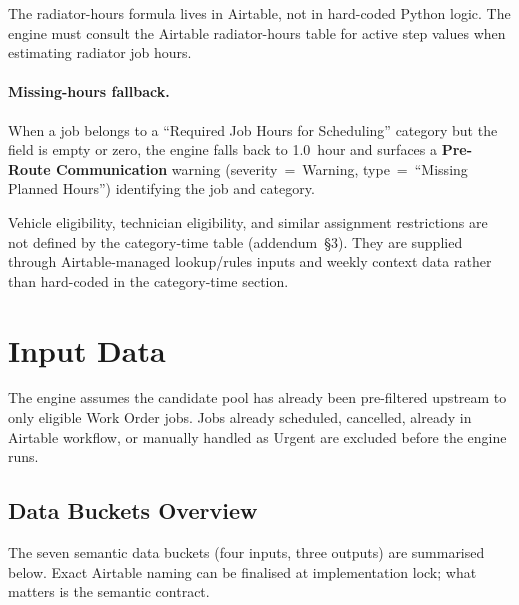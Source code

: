\documentclass[12pt]{article}
\begin{document}
The radiator-hours formula lives in Airtable, not in hard-coded Python logic.
The engine must consult the Airtable radiator-hours table for active step values when estimating radiator job hours.

\paragraph{Missing-hours fallback.}
When a job belongs to a ``Required Job Hours for Scheduling'' category but the field is empty or zero, the engine falls back to 1.0~hour and surfaces a \textbf{Pre-Route Communication} warning (severity~=~Warning, type~=~``Missing Planned Hours'') identifying the job and category.

Vehicle eligibility, technician eligibility, and similar assignment restrictions are not defined by the category-time table (addendum~\S3).
They are supplied through Airtable-managed lookup/rules inputs and weekly context data rather than hard-coded in the category-time section.

\section*{Input Data}

The engine assumes the candidate pool has already been pre-filtered upstream to only eligible Work Order jobs.
Jobs already scheduled, cancelled, already in Airtable workflow, or manually handled as Urgent are excluded before the engine runs.

\subsection*{Data Buckets Overview}

The seven semantic data buckets (four inputs, three outputs) are summarised below.
Exact Airtable naming can be finalised at implementation lock; what matters is the semantic contract.
\end{document}
